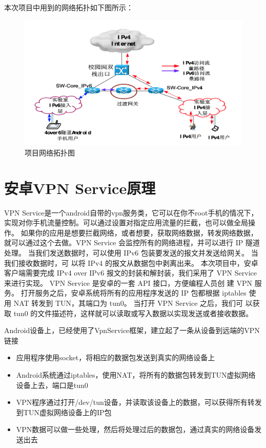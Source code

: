 本次项目中用到的网络拓扑如下图所示：
\begin{figure}[!ht]
\begin{center}
	\includegraphics[scale=.58]{network.png}
    \end{center}
    \caption{项目网络拓扑图}
    \label{figure:network}
\end{figure}

\section{安卓VPN Service原理}

VPN Service是一个android自带的vpn服务类，它可以在你不root手机的情况下，实现对你手机流量控制。可以通过设置对指定应用流量的拦截，也可以做全局操作。
如果你的应用是想要拦截网络，或者想要，获取网络数据，转发网络数据，就可以通过这个去做。VPN Service 会监控所有的网络进程，并可以进行 IP 隧道处理。
当我们发送数据时，可以使用 IPv6 包装要发送的报文并发送给网关。
当我们接收数据时，可 以将 IPv4 的报文从数据包中剥离出来。
本次项目中，安卓客户端需要完成 IPv4 over IPv6 报文的封装和解封装，我们采用了 VPN Service 来进行实现。
VPN Service 是安卓的一套 API 接口，方便编程人员创 建 VPN 服务。
打开服务之后，安卓系统将所有的应用程序发送的 IP 包都根据 iptables 使用 NAT 转发到 TUN，其端口为 tun0。
当打开 VPN Service 之后，我们可 以获取 tun0 的文件描述符，这样就可以读取或写入数据以实现发送或者接收数据。

Android设备上，已经使用了VpnService框架，建立起了一条从设备到远端的VPN链接
\begin{itemize}
\item 应用程序使用socket，将相应的数据包发送到真实的网络设备上
\item Android系统通过iptables，使用NAT，将所有的数据包转发到TUN虚拟网络设备上去，端口是tun0
\item VPN程序通过打开/dev/tun设备，并读取该设备上的数据，可以获得所有转发到TUN虚拟网络设备上的IP包
\item VPN数据可以做一些处理，然后将处理过后的数据包，通过真实的网络设备发送出去
\end{itemize}

